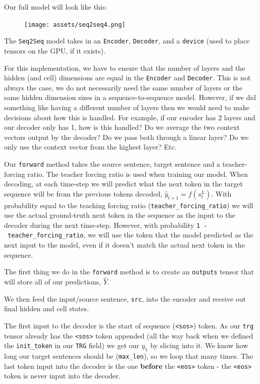 \documentclass[11pt]{article}
\begin{document}
Our full model will look like this:

\begin{figure}
\centering
\texttt{[image: assets/seq2seq4.png]}
\caption{}
\end{figure}

The \texttt{Seq2Seq} model takes in an \texttt{Encoder},
\texttt{Decoder}, and a \texttt{device} (used to place tensors on the
GPU, if it exists).

For this implementation, we have to ensure that the number of layers and
the hidden (and cell) dimensions are equal in the \texttt{Encoder} and
\texttt{Decoder}. This is not always the case, we do not necessarily
need the same number of layers or the same hidden dimension sizes in a
sequence-to-sequence model. However, if we did something like having a
different number of layers then we would need to make decisions about
how this is handled. For example, if our encoder has 2 layers and our
decoder only has 1, how is this handled? Do we average the two context
vectors output by the decoder? Do we pass both through a linear layer?
Do we only use the context vector from the highest layer? Etc.

Our \texttt{forward} method takes the source sentence, target sentence
and a teacher-forcing ratio. The teacher forcing ratio is used when
training our model. When decoding, at each time-step we will predict
what the next token in the target sequence will be from the previous
tokens decoded, \(\hat{y}_{t+1}=f(s_t^L)\). With probability equal to
the teaching forcing ratio (\texttt{teacher\_forcing\_ratio}) we will
use the actual ground-truth next token in the sequence as the input to
the decoder during the next time-step. However, with probability
\texttt{1\ -\ teacher\_forcing\_ratio}, we will use the token that the
model predicted as the next input to the model, even if it doesn't match
the actual next token in the sequence.

The first thing we do in the \texttt{forward} method is to create an
\texttt{outputs} tensor that will store all of our predictions,
\(\hat{Y}\).

We then feed the input/source sentence, \texttt{src}, into the encoder
and receive out final hidden and cell states.

The first input to the decoder is the start of sequence
(\texttt{\textless{}sos\textgreater{}}) token. As our \texttt{trg}
tensor already has the \texttt{\textless{}sos\textgreater{}} token
appended (all the way back when we defined the \texttt{init\_token} in
our \texttt{TRG} field) we get our \(y_1\) by slicing into it. We know
how long our target sentences should be (\texttt{max\_len}), so we loop
that many times. The last token input into the decoder is the one
\textbf{before} the \texttt{\textless{}eos\textgreater{}} token - the
\texttt{\textless{}eos\textgreater{}} token is never input into the
decoder.
\end{document}
